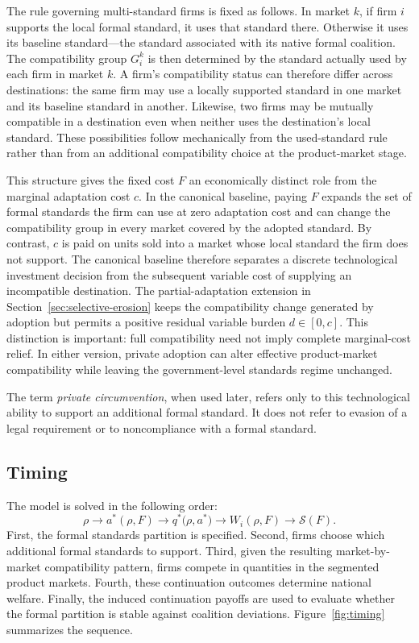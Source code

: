 The rule governing multi-standard firms is fixed as follows. In market $k$, if firm $i$ supports the local formal standard, it uses that standard there. Otherwise it uses its baseline standard---the standard associated with its native formal coalition. The compatibility group $G_i^k$ is then determined by the standard actually used by each firm in market $k$. A firm's compatibility status can therefore differ across destinations: the same firm may use a locally supported standard in one market and its baseline standard in another. Likewise, two firms may be mutually compatible in a destination even when neither uses the destination's local standard. These possibilities follow mechanically from the used-standard rule rather than from an additional compatibility choice at the product-market stage.

This structure gives the fixed cost $F$ an economically distinct role from the marginal adaptation cost $c$. In the canonical baseline, paying $F$ expands the set of formal standards the firm can use at zero adaptation cost and can change the compatibility group in every market covered by the adopted standard. By contrast, $c$ is paid on units sold into a market whose local standard the firm does not support. The canonical baseline therefore separates a discrete technological investment decision from the subsequent variable cost of supplying an incompatible destination. The partial-adaptation extension in Section~\ref{sec:selective-erosion} keeps the compatibility change generated by adoption but permits a positive residual variable burden $d\in[0,c]$. This distinction is important: full compatibility need not imply complete marginal-cost relief. In either version, private adoption can alter effective product-market compatibility while leaving the government-level standards regime unchanged.

The term \emph{private circumvention}, when used later, refers only to this technological ability to support an additional formal standard. It does not refer to evasion of a legal requirement or to noncompliance with a formal standard.

\subsection{Timing}
\label{subsec:model-timing}

The model is solved in the following order:
\begin{equation}
    \rho
    \longrightarrow
    a^\ast(\rho,F)
    \longrightarrow
    q^\ast\bigl(\rho,a^\ast\bigr)
    \longrightarrow
    W_i(\rho,F)
    \longrightarrow
    \mathcal S(F).
    \label{eq:model-timing}
\end{equation}
First, the formal standards partition is specified. Second, firms choose which additional formal standards to support. Third, given the resulting market-by-market compatibility pattern, firms compete in quantities in the segmented product markets. Fourth, these continuation outcomes determine national welfare. Finally, the induced continuation payoffs are used to evaluate whether the formal partition is stable against coalition deviations. Figure~\ref{fig:timing} summarizes the sequence.

